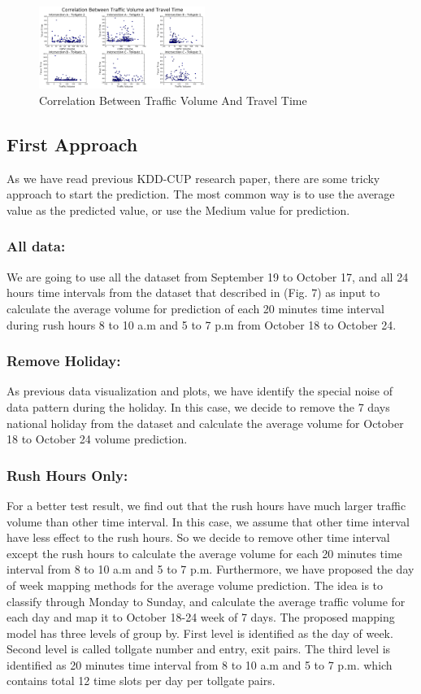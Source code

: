 \documentclass[journal, letterpaper]{IEEEtran}
\begin{document}
\begin{figure} [H]
  \centering
  \includegraphics[width=0.48\textwidth]{corr_volume_time.png}
  \caption{Correlation Between Traffic Volume And Travel Time}
  \captionsetup{justification=centering}
  \label{fig:11}
\end{figure}

\subsection{First Approach}
As we have read previous KDD-CUP research paper, there are some tricky approach to start the prediction. The most common way is to use the average value as the predicted value, or use the Medium value for prediction.
\subsubsection{All data:}
We are going to use all the dataset from September 19 to October 17, and all 24 hours time intervals from the dataset that described in (Fig. 7) as input to calculate the average volume for prediction of each 20 minutes time interval during rush hours 8 to 10 a.m and 5 to 7 p.m from October 18 to October 24. 
\subsubsection{Remove Holiday:}
As previous data visualization and plots, we have identify the special noise of data pattern during the holiday. In this case, we decide to remove the 7 days national holiday from the dataset and calculate the average volume for October 18 to October 24 volume prediction.
\subsubsection{Rush Hours Only:}
For a better test result, we find out that the rush hours have much larger traffic volume than other time interval. In this case, we assume that other time interval have less effect to the rush hours. So we decide to remove other time interval except the rush hours to calculate the average volume for each 20 minutes time interval from 8 to 10 a.m and 5 to 7 p.m. Furthermore, we have proposed the day of week mapping methods for the average volume prediction. The idea is to classify through Monday to Sunday, and calculate the average traffic volume for each day and map it to October 18-24 week of 7 days. The proposed mapping model has three levels of group by. First level is identified as the day of week. Second level is called tollgate number and entry, exit pairs. The third level is identified as 20 minutes time interval from 8 to 10 a.m and 5 to 7 p.m. which contains total 12 time slots per day per tollgate pairs. 
\end{document}
